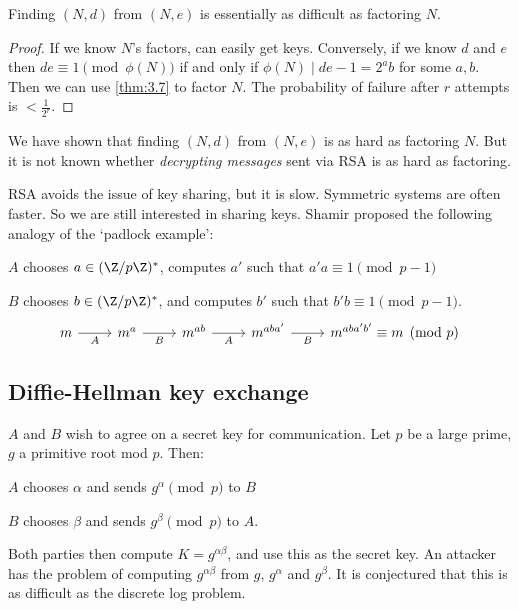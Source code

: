 \documentclass{article}
\newcommand{\1}[1]{\mathbbm{1}_{#1}}
\begin{document}
\begin{cor}
    Finding $(N, d)$ from $(N, e)$ is essentially as difficult as factoring $N$.
\end{cor}
\begin{proof}
    If we know $N$'s factors, can easily get keys.
    Conversely, if we know $d$ and $e$ then $de \equiv 1 \pmod{\phi(N)}$ if and only if $\phi(N) \mid de-1 = 2^a b$ for some $a, b$.
    Then we can use \cref{thm:3.7} to factor $N$. The probability of failure after $r$ attempts is $< \frac{1}{2^r}$.
\end{proof}

\begin{remark}
    We have shown that finding $(N, d)$ from $(N, e)$ is as hard as factoring $N$.
    But it is not known whether \emph{decrypting messages} sent via RSA is as hard as factoring.
\end{remark}

RSA avoids the issue of key sharing, but it is slow. Symmetric systems are often faster.
So we are still interested in sharing keys.
Shamir proposed the following analogy of the `padlock example':

$A$ chooses $a \in (\Z/p\Z)^*$, computes $a'$ such that $a' a \equiv 1 \pmod{p-1}$

$B$ chooses $b \in (\Z/p\Z)^*$, and computes $b'$ such that $b' b \equiv 1 \pmod{p-1}$.
\begin{equation*}
    \begin{tikzcd}
        m \rar["A"'] & m^a \rar["B"'] & m^{ab} \rar["A"'] & m^{aba'} \rar["B"'] & m^{aba'b'} \equiv m \pmod{p}
    \end{tikzcd} \\
\end{equation*}

\subsection{Diffie-Hellman key exchange}
$A$ and $B$ wish to agree on a secret key for communication.
Let $p$ be a large prime, $g$ a primitive root mod $p$. Then:

$A$ chooses $\alpha$ and sends $g^\alpha \pmod{p}$ to $B$

$B$ chooses $\beta$ and sends $g^\beta \pmod{p}$ to $A$.

Both parties then compute $K=g^{\alpha \beta}$, and use this as the secret key.
An attacker has the problem of computing $g^{\alpha\beta}$ from $g$, $g^\alpha$ and $g^\beta$.
It is conjectured that this is as difficult as the discrete log problem.
\end{document}
